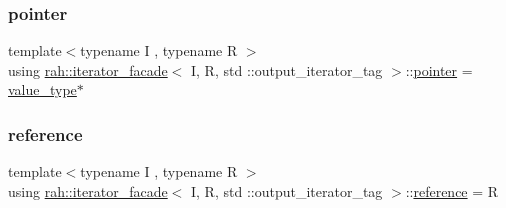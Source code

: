 \subsubsection{\texorpdfstring{pointer}{pointer}}
{\footnotesize\ttfamily template$<$typename I , typename R $>$ \\
using \mbox{\hyperlink{structrah_1_1iterator__facade}{rah\+::iterator\+\_\+facade}}$<$ I, R, std \+::output\+\_\+iterator\+\_\+tag $>$\+::\mbox{\hyperlink{structrah_1_1iterator__facade_3_01_i_00_01_r_00_01std_01_1_1output__iterator__tag_01_4_aaa99676a12d594e70c36d9c6fc3deb52}{pointer}} =  \mbox{\hyperlink{structrah_1_1iterator__facade_3_01_i_00_01_r_00_01std_01_1_1output__iterator__tag_01_4_ad112e27b0b6caafdfab6cd47bbc66e73}{value\+\_\+type}}$\ast$}

\mbox{\label{structrah_1_1iterator__facade_3_01_i_00_01_r_00_01std_01_1_1output__iterator__tag_01_4_a372d828166749a15dafbeabecc0674d9}} 
\subsubsection{\texorpdfstring{reference}{reference}}
{\footnotesize\ttfamily template$<$typename I , typename R $>$ \\
using \mbox{\hyperlink{structrah_1_1iterator__facade}{rah\+::iterator\+\_\+facade}}$<$ I, R, std \+::output\+\_\+iterator\+\_\+tag $>$\+::\mbox{\hyperlink{structrah_1_1iterator__facade_3_01_i_00_01_r_00_01std_01_1_1output__iterator__tag_01_4_a372d828166749a15dafbeabecc0674d9}{reference}} =  R}

\mbox{\label{structrah_1_1iterator__facade_3_01_i_00_01_r_00_01std_01_1_1output__iterator__tag_01_4_ad112e27b0b6caafdfab6cd47bbc66e73}} 
